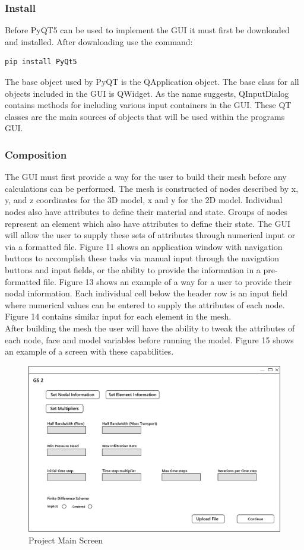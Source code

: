 \documentclass[onecolumn, draftclsnofoot,10pt, compsoc]{IEEEtran}
\begin{document}
\subsubsection{Install}
 Before PyQT5 can be used to implement the GUI it must first be downloaded and installed. After downloading use the command:
\begin{lstlisting}[language=python]
    pip install PyQt5
\end{lstlisting}
The base object used by PyQT is the QApplication object. The base class for all objects included in the GUI is QWidget. As the name suggests, QInputDialog contains methods for including various input containers in the GUI. These QT classes are the main sources of objects that will be used within the programs GUI.

\subsubsection{Composition}
The GUI must first provide a way for the user to build their mesh before any calculations can be performed. The mesh is constructed of nodes described by x, y, and z coordinates for the 3D model, x and y for the 2D model. Individual nodes also have attributes to define their material and state. Groups of nodes represent an element which also have attributes to define their state. The GUI will allow the user to supply these sets of attributes through numerical input or via a formatted file. Figure 11 shows an application window with navigation buttons to accomplish these tasks via manual input through the navigation buttons and input fields, or the ability to provide the information in a pre-formatted file. Figure 13 shows an example of a way for a user to provide their nodal information. Each individual cell below the header row is an input field where numerical values can be entered to supply the attributes of each node. Figure 14 contains similar input for each element in the mesh.\\
After building the mesh the user will have the ability to tweak the attributes of each node, face and model variables before running the model. Figure 15 shows an example of a screen with these capabilities.
\begin{figure}[H]
\centering
\includegraphics[scale=0.5]{GS2_home.png}
\caption{Project Main Screen}
\label{fig:Project Screen}
\end{figure}
\end{document}
